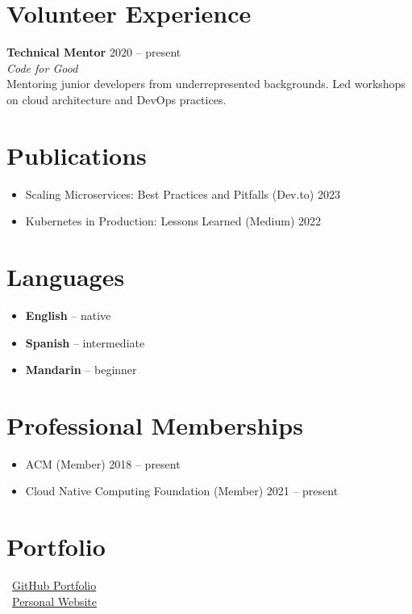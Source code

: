 \documentclass[10pt]{article}
\begin{document}
\section*{Volunteer Experience}
\textbf{Technical Mentor} \hfill 2020 -- present \\
\textit{Code for Good} \\
Mentoring junior developers from underrepresented backgrounds. Led workshops on cloud architecture and DevOps practices. \\

\section*{Publications}
\begin{itemize}[nosep,leftmargin=*]
    \item Scaling Microservices: Best Practices and Pitfalls (Dev.to) \hfill 2023
    \item Kubernetes in Production: Lessons Learned (Medium) \hfill 2022
\end{itemize}

\section*{Languages}
\begin{itemize}
    \item \textbf{English} -- native
    \item \textbf{Spanish} -- intermediate
    \item \textbf{Mandarin} -- beginner
\end{itemize}

\section*{Professional Memberships}
\begin{itemize}[nosep,leftmargin=*]
    \item ACM (Member) \hfill 2018 -- present
    \item Cloud Native Computing Foundation (Member) \hfill 2021 -- present
\end{itemize}

\section*{Portfolio}
~\href{https://github.com/github}{GitHub Portfolio}\\
~\href{https://google.com}{Personal Website}\\
\end{document}
